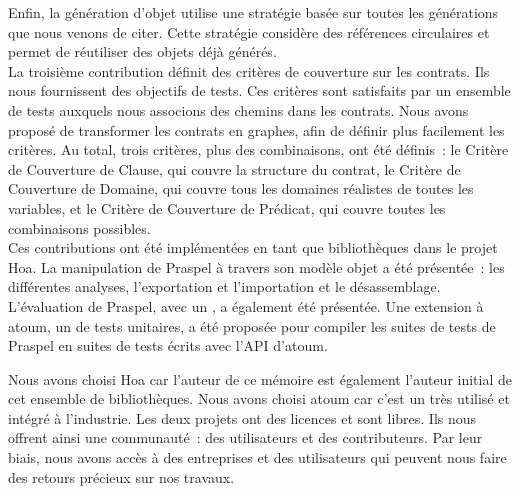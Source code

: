 Enfin, la génération d'objet utilise une stratégie basée sur toutes les
générations que nous venons de citer. Cette stratégie considère des références
circulaires et permet de réutiliser des objets déjà générés. \\

La troisième contribution définit des critères de couverture sur les contrats.
Ils nous fournissent des objectifs de tests. Ces critères sont satisfaits par un
ensemble de tests auxquels nous associons des chemins dans les contrats. Nous
avons proposé de transformer les contrats en graphes, afin de définir plus
facilement les critères. Au total, trois critères, plus des combinaisons, ont
été définis~: le Critère de Couverture de Clause, qui couvre la structure du
contrat, le Critère de Couverture de Domaine, qui couvre tous les domaines
réalistes de toutes les variables, et le Critère de Couverture de Prédicat, qui
couvre toutes les combinaisons possibles. \\

Ces contributions ont été implémentées en tant que bibliothèques dans le projet
Hoa. La manipulation de Praspel à travers son modèle objet a été présentée~: les
différentes analyses, l'exportation et l'importation et le désassemblage.
L'évaluation de Praspel, avec un , a
également été présentée. Une extension à atoum, un  de
tests unitaires, a été proposée pour compiler les suites de tests de Praspel en
suites de tests écrits avec l'API d'atoum.

Nous avons choisi Hoa car l'auteur de ce mémoire est également l'auteur initial
de cet ensemble de bibliothèques. Nous avons choisi atoum car c'est un
 très utilisé et intégré à l'industrie. Les deux projets
ont des licences  et sont libres. Ils nous offrent ainsi
une communauté~: des utilisateurs et des contributeurs. Par leur biais, nous
avons accès à des entreprises et des utilisateurs qui peuvent nous faire des
retours précieux sur nos travaux. \\

